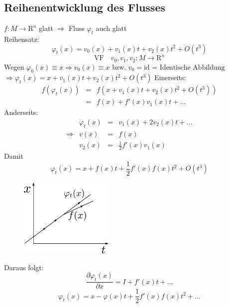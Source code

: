 \documentclass[ngerman]{tudscrreprt}
\begin{document}
\subsection*{Reihenentwicklung des Flusses}
$f: M \to \mathrm{R}^n $ glatt $\Rightarrow$ Fluss $\varphi_t$ auch glatt \\ 
Reihensatz: 
\begin{equation*}
\varphi_t(x) = v_0 (x) + v_1(x)t + v_2(x)t^2 + O(t^3)
\end{equation*}
\begin{equation*}
\text{VF} \quad v_0, v_1, v_2: M \to \mathrm{R}^n
\end{equation*}
Wegen $\varphi_0(x) \equiv x \Rightarrow v_0(x) \equiv x$ bzw. $v_0 = \text{id = Identische Abbildung}$
\\ $\Rightarrow \varphi_t(x) = x + v_1 (x)t + v_2(x)t^2 + O(t^3)  $
Einerseits: \begin{equation*} 
\begin{matrix}
f(\varphi_t(x)) &=& f(x+ v_1(x)t + v_2(x)t^2 + O(t^3)  )\\ 
&=&f(x)+ f'(x) v_1(x) t + \dots   
\end{matrix}
\end{equation*}
Anderseits: \begin{equation*}
\begin{matrix}
&\dot{\varphi}_t(x) &=& v_1(x) + 2v_2(x) t + \dots \\ 
\Rightarrow &v(x) &=& f(x)\\ 
&v_2(x) &=& \frac{1}{2}f'(x) v_1(x)
\end{matrix}
\end{equation*}
Damit \begin{equation*}
\varphi_t(x) = x + f(x) t + \frac{1}{2}f'(x) f(x)t^2 + O(t^3)\tag{2.3}
\end{equation*}
\begin{figure}[H]
\centering
\def\svgwidth{200pt} 
  \includegraphics[width=4.5cm]{images/image4.pdf}
\end{figure}
Daraus folgt: 
\begin{equation*}
\frac{\partial \varphi_t(x)}{\partial x} = I + f'(x)t + \dots  \tag{2.4}
\end{equation*}
\begin{equation*}
\varphi_t(x) = x - \varphi(x) t + \frac{1}{2}f'(x) f(x) t^2 + \dots  \tag{2.5}
\end{equation*}
\end{document}
